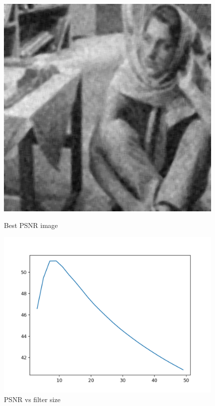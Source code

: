 \documentclass{article}
\begin{document}
    \begin{figure}[!htb]
      \includegraphics[scale=0.3]{./basic_denoising/barbara/median_best_gaussian.png}
      \caption{Best PSNR image}
    \endminipage \hfill
      \includegraphics[scale=.45]{./basic_denoising/barbara/median_psnr_gaussian.png}
      \caption{PSNR vs filter size}
    \endminipage
    \end{figure}
    \pagebreak
\end{document}
